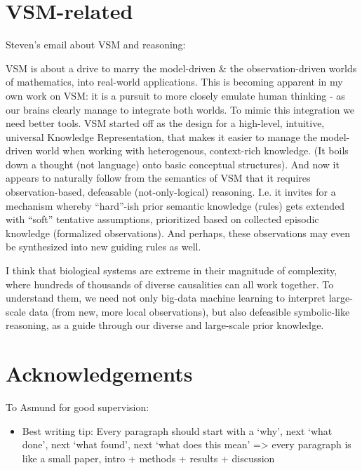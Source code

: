 \documentclass[
  12pt,
]{book}
\providecommand{\tightlist}{%
  \setlength{\itemsep}{0pt}\setlength{\parskip}{0pt}}
\begin{document}
\hypertarget{vsm-related}{%
\section*{VSM-related}\label{vsm-related}}

Steven's email about VSM and reasoning:

VSM is about a drive to marry the model-driven \& the observation-driven worlds of mathematics, into real-world applications.
This is becoming apparent in my own work on VSM: it is a pursuit to more closely emulate human thinking - as our brains clearly manage to integrate both worlds.
To mimic this integration we need better tools.
VSM started off as the design for a high-level, intuitive, universal Knowledge Representation, that makes it easier to manage the model-driven world when working with heterogenous, context-rich knowledge.
(It boils down a thought (not language) onto basic conceptual structures).
And now it appears to naturally follow from the semantics of VSM that it requires observation-based, defeasable (not-only-logical) reasoning.
I.e. it invites for a mechanism whereby ``hard''-ish prior semantic knowledge (rules) gets extended with ``soft'' tentative assumptions, prioritized based on collected episodic knowledge (formalized observations).
And perhaps, these observations may even be synthesized into new guiding rules as well.

I think that biological systems are extreme in their magnitude of complexity, where hundreds of thousands of diverse causalities can all work together.
To understand them, we need not only big-data machine learning to interpret large-scale data (from new, more local observations), but also defeasible symbolic-like reasoning, as a guide through our diverse and large-scale prior knowledge.

\hypertarget{acknowledgements}{%
\section*{Acknowledgements}\label{acknowledgements}}

To Asmund for good supervision:

\begin{itemize}
\tightlist
\item
  Best writing tip: Every paragraph should start with a `why', next `what done', next `what found', next `what does this mean' =\textgreater{} every paragraph is like a small paper, intro + methods + results + discussion
\end{itemize}
\end{document}
